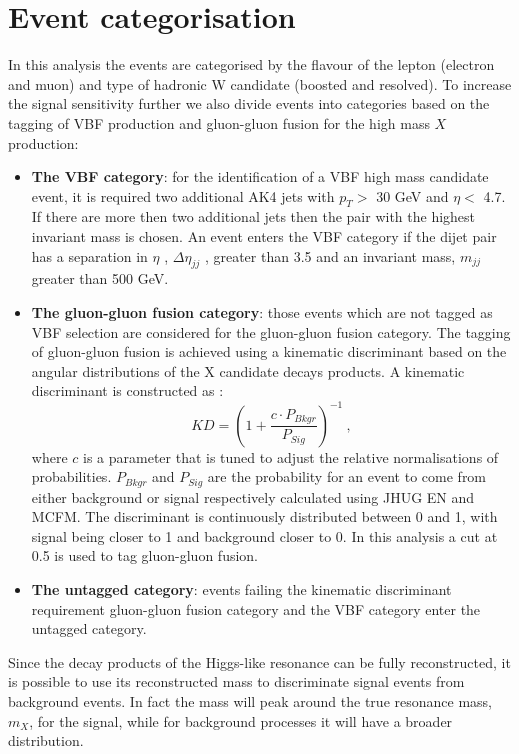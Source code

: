 \section{Event categorisation}
In this analysis the events are categorised by the flavour of the lepton (electron and muon)
and type of hadronic W candidate (boosted and resolved). To increase the signal sensitivity
further we also divide events into categories based on the tagging of VBF  production and
gluon-gluon fusion for the high mass $X$ production:
\begin{itemize}
\item {\bf The VBF category}: for the identification of a VBF high mass candidate event, it is required two additional AK4 jets
with $p_T>$ 30 GeV and $\eta <$ 4.7. If there are more then two additional jets then the pair with
the highest invariant mass is chosen. An event enters the VBF category if the dijet pair has a
separation in $\eta$ ,  $\Delta \eta_{jj}$ , greater than 3.5 and an invariant mass, $m_{jj}$ greater than 500 GeV.
\item {\bf The gluon-gluon fusion category}: those events which are not tagged as VBF selection are considered for the gluon-gluon fusion category. 
The tagging of gluon-gluon fusion  is achieved
using a kinematic discriminant based on the angular distributions of the X candidate decays
products. A kinematic discriminant is constructed as :
\begin{equation}
KD=(1+\frac{c \cdot P_{Bkgr}}{P_{Sig}})^{-1} \: , \end{equation}
where $c$ is a parameter that is tuned to adjust the relative normalisations of probabilities. 
$ P_{Bkgr}$ and $P_{Sig}$  are the probability for an event to come from either background or signal respectively calculated using JHUG EN and MCFM.
The discriminant is continuously distributed between 0 and 1, with signal being closer to 1 and background closer to 0. 
In this analysis a cut at 0.5 is used to tag gluon-gluon fusion.
\item {\bf The untagged category}: events failing the   kinematic discriminant requirement  gluon-gluon fusion category and the  VBF category 
enter the untagged category.
\end{itemize}
Since the decay products of the Higgs-like resonance can be fully reconstructed, it is possible to use
its reconstructed mass to discriminate signal events from background
events. In fact the mass will peak around the true resonance mass, $m_X$, for the signal,
while for background processes it will have a broader distribution.\\ 
